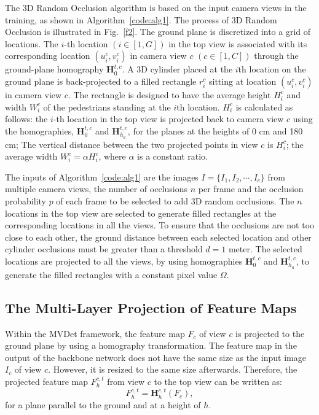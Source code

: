 \documentclass[runningheads]{llncs}
\begin{document}
	The 3D Random Occlusion algorithm is based on the input camera views in the training, as shown in Algorithm~\ref{code:alg1}. The process of 3D Random Occlusion is illustrated in Fig.~\ref{f2}. The ground plane is discretized into a grid of locations. The $i$-th location $(i \in [1, G])$ in the top view is associated with its corresponding location $(u^c_i,v^c_i)$ in camera view $c$ $(c\in [1, C])$ through the ground-plane homography $\textbf{H}^{t,c}_0$. A 3D cylinder placed at the $i$th location on the ground plane is back-projected to a filled rectangle $r_i^c$ sitting at location $(u_i^c, v_i^c)$ in camera view $c$. The rectangle is designed to have the average height $H_i^c$ and width $W_i^c$ of the pedestrians standing at the $i$th location. $H_i^c$ is calculated as follows: the $i$-th location in the top view is projected back to camera view $c$ using the homographies, $\textbf{H}^{t,c}_0$ and $\textbf{H}^{t,c}_{h_a}$, for the planes at the heights of 0 cm and 180 cm; The vertical distance between the two projected points in view $c$ is $H_i^c$; the average width $W_i^c=\alpha H_i^c$, where $\alpha$ is a constant ratio.
	
	The inputs of Algorithm~\ref{code:alg1} are the images $I=\{I_1, I_2,\cdots, I_c\}$ from multiple camera views, the number of occlusions $n$ per frame and the occlusion probability $p$ of each frame to be selected to add 3D random occlusions. The $n$ locations in the top view are selected to generate filled rectangles at the corresponding locations in all the views. To ensure that the occlusions are not too close to each other, the ground distance between each selected location and other cylinder occlusions must be greater than a threshold $d=1$ meter. The selected locations are projected to all the views, by using homographies $\textbf{H}^{t,c}_0$ and $\textbf{H}^{t,c}_{h_a}$, to generate the filled rectangles with a constant pixel value $\Omega$.
	
	
	\subsection{The Multi-Layer Projection of Feature Maps}
	Within the MVDet framework, the feature map $F_c$ of view $c$ is projected to the ground plane by using a homography transformation. The feature map in the output of the backbone network does not have the same size as the input image $I_c$ of view $c$. However, it is resized to the same size afterwards. Therefore, the projected feature map $F_h^{c,t}$ from view $c$ to the top view can be written as:
	\begin{equation}
		F_h^{c,t} = \textbf{H}^{c,t}_{h}(F_c),
	\end{equation}
	for a plane parallel to the ground and at a height of $h$.
\end{document}
